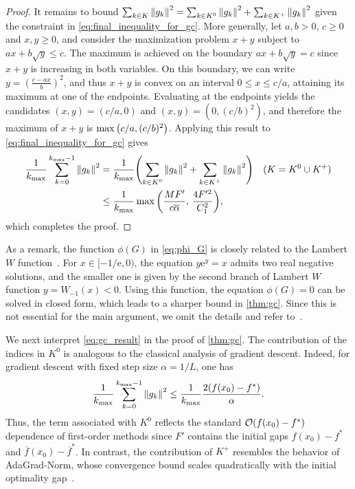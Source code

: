 \documentclass[journal]{subfiles}
\begin{document}
\begin{proof}
    It remains to bound $\sum_{k\in K}\norm{g_k}^2 = \sum_{k\in K^0}\norm{g_k}^2 + \sum_{k\in K^+}\norm{g_k}^2$ given the constraint in \cref{eq:final_inequality_for_gc}.
    More generally, let $a,b>0$, $c\ge 0$ and $x,y\ge 0$, and consider the maximization problem $x+y$ subject to $a x + b\sqrt{y} \le c$.
    The maximum is achieved on the boundary $a x + b\sqrt{y}=c$ since $x+y$ is increasing in both variables.
    On this boundary, we can write $y=\left(\frac{c-a x}{b}\right)^2$, and thus $x+y$ is convex on an interval $0\le x\le c/a$, attaining its maximum at one of the endpoints.
    Evaluating at the endpoints yields the candidates $(x,y)=(c/a,0)$ and $(x,y)=(0,(c/b)^2)$, and therefore the maximum of $x+y$ is $\max\qty(c/a, (c/b)^2)$.
    Applying this result to \cref{eq:final_inequality_for_gc} gives
    \begin{align}
        \frac{1}{k_{\max}} \sum_{k=0}^{k_{\max}-1} \norm{g_k}^2
         & = \frac{1}{k_{\max}} \qty(\sum_{{k} \in K^0} \norm{g_{k}}^2 + \sum_{k \in K^+} \norm{g_{k}}^2)                    &  & (K=K^0 \cup K^+) \notag \\
         & \leq \frac{1}{k_{\max}} \max\qty(\frac{M F'}{c \overline{\alpha}}, \, \frac{4 F'^2}{C_1^2}), \label{eq:gc_result}
    \end{align}
    which completes the proof.
    \myQED
\end{proof}

As a remark, the function $\phi(G)$ in \cref{eq:phi_G} is closely related to the Lambert $W$ function~\citep{corlessLambertWFunction1996,Gratton08022024}.
For $x \in [-1/\mathrm{e},0)$, the equation $y \mathrm{e}^y = x$ admits two real negative solutions, and the smaller one is given by the second branch of Lambert $W$ function $y = W_{-1}(x) < 0$. Using this function, the equation $\phi(G)=0$ can be solved in closed form, which leads to a sharper bound in \cref{thm:gc}.
Since this is not essential for the main argument, we omit the details and refer to~\citep{Gratton08022024}.

We next interpret \cref{eq:gc_result} in the proof of \cref{thm:gc}.
The contribution of the indices in $K^0$ is analogous to the classical analysis of gradient descent. Indeed, for gradient descent with fixed step size $\alpha = 1/L$, one has
\begin{equation*}
    \frac{1}{k_{\max}}\sum_{k=0}^{k_{\max}-1} \norm{g_k}^2 \le \frac{1}{k_{\max}}\frac{2(f(x_0)-f^*)}{\alpha}.
\end{equation*}
Thus, the term associated with $K^0$ reflects the standard $\order{f(x_0)-f^*}$ dependence of first-order methods since $F'$ contains the initial gaps $f(x_0)-f^*$ and $\overline{f}(x_0)-\overline{f}^*$.
In contrast, the contribution of $K^+$ resembles the behavior of AdaGrad-Norm, whose convergence bound scales quadratically with the initial optimality gap~\citep{wardAdaGradStepsizesSharp2020}.
\end{document}
